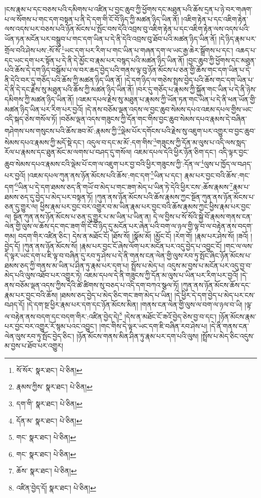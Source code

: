 །ངས་རྣམ་པ་དང་བཅས་པའི་དམིགས་པ་འཛིན་པ་བྱང་ཆུབ་ཀྱི་ཕྱོགས་དང་མཐུན་པའི་ཆོས་དྲན་པ་ཉེ་བར་གཞག་པ་ལ་སོགས་པ་གང་དག་བསྟན་པ་ནི་དེ་དག་གི་ངོ་བོ་ཉིད་ཀྱི་མཚན་ཉིད་ཡིན་ནོ། །འཇིག་རྟེན་པ་དང་འཇིག་རྟེན་ལས་འདས་པར་བཅས་པའི་ཉོན་མོངས་པ་སྤོང་བས་དེའི་འབྲས་བུ་འཇིག་རྟེན་པ་དང་འཇིག་རྟེན་ལས་འདས་པའི་ཡོན་ཏན་མངོན་པར་བསྒྲུབ་པ་གང་དག་ཡིན་པ་དེ་ནི་དེའི་འབྲས་བུ་ཐོབ་པའི་མཚན་ཉིད་ཡིན་ནོ། །དེ་ཉིད་རྣམ་པར་གྲོལ་བའི་ཤེས་པས་:སོ་སོ་\footnote{སོ་སོར་  སྣར་ཐང་།  པེ་ཅིན། }ཡང་དག་པར་རིག་པ་གང་ཡིན་པ་གཞན་དག་ལ་ཡང་རྒྱ་ཆེར་སྒྲོགས་པ་དང་། འཆད་པ་དང་ཡང་དག་པར་སྟོན་པ་དེ་ནི་དེ་མྱོང་བ་རྣམ་པར་བསྙད་པའི་མཚན་ཉིད་ཡིན་ནོ། །བྱང་ཆུབ་ཀྱི་ཕྱོགས་དང་མཐུན་པའི་ཆོས་དེ་དག་ཉིད་བསྒོམ་པ་ལ་བར་ཆད་བྱེད་པའི་གནས་ལྟ་བུ་ཉོན་མོངས་པ་ཅན་གྱི་ཆོས་གང་དག་ཡིན་པ་དེ་ནི་དེའི་བར་དུ་གཅོད་པའི་ཆོས་ཀྱི་མཚན་ཉིད་ཡིན་ནོ། །དེ་དག་ཉིད་ལ་གཅེས་སྤྲས་བྱེད་པའི་ཆོས་གང་དག་ཡིན་པ་དེ་ནི་དེ་དང་རྗེས་སུ་མཐུན་པའི་ཆོས་ཀྱི་མཚན་ཉིད་ཡིན་ནོ། །བར་དུ་གཅོད་པ་རྣམས་ཀྱི་སྐྱོན་གང་ཡིན་པ་དེ་ནི་ཉེས་དམིགས་ཀྱི་མཚན་ཉིད་ཡིན་ནོ། །འཇམ་དཔལ་རྗེས་སུ་མཐུན་པ་རྣམས་ཀྱི་ཡོན་ཏན་གང་ཡིན་པ་དེ་ནི་ཕན་ཡོན་གྱི་མཚན་ཉིད་ཡིན་པར་རིག་པར་བྱའོ། །དེ་ནས་བཅོམ་ལྡན་འདས་ལ་བྱང་ཆུབ་སེམས་དཔའ་འཇམ་དཔལ་གྱིས་ཡང་འདི་སྐད་ཅེས་གསོལ་ཏོ། །བཅོམ་ལྡན་འདས་གཟུངས་ཀྱི་དོན་གང་གིས་བྱང་ཆུབ་སེམས་དཔའ་རྣམས་དེ་བཞིན་གཤེགས་པས་གསུངས་པའི་ཆོས་ཟབ་མོ་:རྣམས་ཀྱི་\footnote{རྣམས་ཀྱིས་  སྣར་ཐང་།  པེ་ཅིན། }ལྡེམ་པོར་དགོངས་པའི་རྗེས་སུ་འཇུག་པར་འགྱུར་བ་བྱང་ཆུབ་སེམས་དཔའ་རྣམས་ཀྱི་མདོ་སྡེ་དང་། འདུལ་བ་དང་མ་མོ་:དག་གིས་\footnote{དག་གི་  སྣར་ཐང་།  པེ་ཅིན། }གཟུངས་ཀྱི་དོན་མ་ལུས་པ་འདི་ལས་སླད་རོལ་པ་རྣམས་དང་ཐུན་མོང་མ་ལགས་པ་བཤད་དུ་གསོལ། འཇམ་དཔལ་དེའི་ཕྱིར་ཉོན་ཅིག་དང་། འདི་ལྟར་བྱང་ཆུབ་སེམས་དཔའ་རྣམས་ངའི་ལྡེམ་པོ་ངག་ལ་འཇུག་པར་བྱ་བའི་ཕྱིར་གཟུངས་ཀྱི་:དོན་ལ་\footnote{དོན་མ་  སྣར་ཐང་།  པེ་ཅིན། }ལུས་པ་ཁྱོད་ལ་བཤད་པར་བྱའོ། །འཇམ་དཔལ་ཀུན་ནས་ཉོན་མོངས་པའི་ཆོས་:གང་དག་\footnote{གང་  སྣར་ཐང་།  པེ་ཅིན། }ཡིན་པ་དང་། རྣམ་པར་བྱང་བའི་ཆོས་:གང་དག་\footnote{གང་  སྣར་ཐང་།  པེ་ཅིན། }ཡིན་པ་དེ་དག་ཐམས་ཅད་ནི་གཡོ་བ་མེད་པ་གང་ཟག་མེད་པ་ཡིན་ཏེ་དེའི་ཕྱིར་ངས་:ཆོས་རྣམས་\footnote{ཆོས་  སྣར་ཐང་།  པེ་ཅིན། }རྣམ་པ་ཐམས་ཅད་དུ་བྱེད་པ་མེད་པར་བསྟན་ཏོ། །ཀུན་ནས་ཉོན་མོངས་པའི་ཆོས་རྣམས་ཀྱང་སྔོན་ཀུན་ནས་ཉོན་མོངས་པ་ཅན་དུ་གྱུར་ལ། ཕྱིས་རྣམ་པར་བྱང་བར་འགྱུར་བ་མ་ཡིན་རྣམ་པར་བྱང་བའི་ཆོས་རྣམས་ཀྱང་ཕྱིས་རྣམ་པར་བྱང་ལ། སྔོན་ཀུན་ནས་ཉོན་མོངས་པ་ཅན་དུ་གྱུར་པ་མ་ཡིན་པ་ཡིན་ན། དེ་ལ་བྱིས་པ་སོ་སོའི་སྐྱེ་བོ་རྣམས་གནས་ངན་ལེན་གྱི་ལུས་ལ་ཆོས་དང་གང་ཟག་གི་ངོ་བོ་ཉིད་དུ་མངོན་པར་ཞེན་པའི་བག་ལ་ཉལ་གྱི་ལྟ་བ་ལ་བརྟེན་ནས་བདག་གམ། བདག་གིར་འཛིན་ཅིང་། དེས་ན་མཐོང་ངོ། །ཐོས་སོ། །སྣོམ་མོ། །མྱོང་ངོ། །རེག་གོ། །རྣམ་པར་ཤེས་སོ། །ཟའོ། །བྱེད་དོ། །ཀུན་ནས་ཉོན་མོངས་སོ། །རྣམ་པར་བྱང་ངོ་ཞེས་ལོག་པར་མངོན་པར་འདུ་བྱེད་པ་འབྱུང་ངོ། །གང་ལ་ལས་དེ་ལྟར་ཡང་དག་པ་ཇི་ལྟ་བ་བཞིན་དུ་རབ་ཏུ་ཤེས་པ་དེ་ནི་གནས་ངན་ལེན་གྱི་ལུས་རབ་ཏུ་སྤོང་ཞིང་ཉོན་མོངས་པ་ཐམས་ཅད་ཀྱི་གནས་མ་ཡིན་པ་ཤིན་ཏུ་རྣམ་པར་དག་པ། སྤྲོས་པ་མེད་པ། འདུས་མ་བྱས་པ་མངོན་པར་འདུ་བྱ་བ་མེད་པའི་ལུས་འཐོབ་པར་འགྱུར་ཏེ། འཇམ་དཔལ་དེ་ནི་གཟུངས་ཀྱི་དོན་མ་ལུས་པ་ཡིན་པར་རིག་པར་བྱའོ། །དེ་ནས་བཅོམ་ལྡན་འདས་ཀྱིས་དེའི་ཚེ་ཚིགས་སུ་བཅད་པ་འདི་དག་བཀའ་སྩལ་ཏོ། །ཀུན་ནས་ཉོན་མོངས་ཆོས་དང་རྣམ་པར་བྱང་བའི་ཆོས། །ཐམས་ཅད་བྱེད་པ་མེད་ཅིང་གང་ཟག་མེད་པ་ཡིན། །དེ་ཕྱིར་དེ་དག་བྱེད་པ་མེད་པར་ངས་བཤད་དོ། །དེ་དག་སྔ་ཕྱིར་རྣམ་པར་དག་དང་ཉོན་མོངས་མིན། །གནས་ངན་ལེན་གྱི་ལུས་ལ་བག་ལ་ཉལ་བ་ཡི། །ལྟ་ལ་བརྟེན་ནས་བདག་དང་བདག་གིར་:འཛིན་བྱེད་དེ།\footnote{འཛིན་བྱེད་དོ།  སྣར་ཐང་།  པེ་ཅིན། } །དེས་ན་མཐོང་ངོ་ཟའོ་བྱེད་ཅེས་བྱ་བ་དང་། །ཉོན་མོངས་རྣམ་པར་བྱང་བར་འགྱུར་རོ་སྙམ་པའང་འབྱུང་། །གང་གིས་དེ་ལྟར་ཡང་དག་ཇི་བཞིན་རབ་ཤེས་པ། །དེ་ནི་གནས་ངན་ལེན་ལུས་རབ་ཏུ་སྤོང་བྱེད་ཅིང་། །ཉོན་མོངས་གནས་མིན་ཤིན་ཏུ་རྣམ་པར་དག་པའི་ལུས། །སྤྲོས་པ་མེད་ཅིང་འདུས་མ་བྱས་པ་ཐོབ་པར་འགྱུར། 